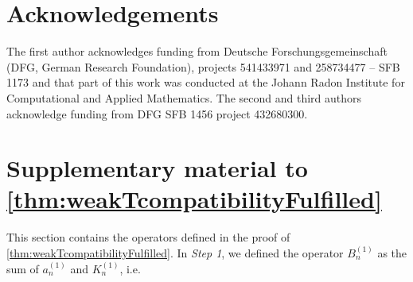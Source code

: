 \documentclass{m2an}
\newcommand{\BnI}{B_n^{(1)}}
\newcommand{\KnI}{K_n^{(1)}}
\newcommand{\anI}{a_n^{(1)}}
\theoremstyle{plain}
\theoremstyle{definition}
\begin{document}
\section*{Acknowledgements}
The first author acknowledges funding from Deutsche Forschungsgemeinschaft (DFG, German Research Foundation), projects 541433971 and 258734477 – SFB 1173 and that part of this work was conducted at the Johann Radon Institute for Computational and Applied Mathematics.
The second and third authors acknowledge funding from DFG SFB 1456 project 432680300.


%


\appendix
\allowdisplaybreaks 
\section{Supplementary material to \cref{thm:weakTcompatibilityFulfilled}}\label{appendix:operators}
This section contains the operators defined in the proof of \cref{thm:weakTcompatibilityFulfilled}. In \emph{Step 1}, we defined the operator $\BnI$ as the sum of $\anI$ and $\KnI$, i.e. 
\end{document}

